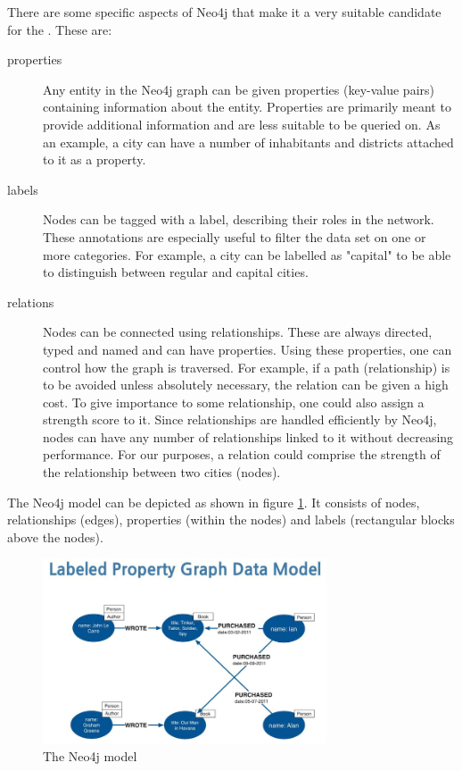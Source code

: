 There are some specific aspects of Neo4j that make it a very suitable candidate for the . These are:

\begin{description}
\item[properties] Any entity in the Neo4j graph can be given properties (key-value pairs) containing information about the entity. Properties are primarily meant to provide additional information and are less suitable to be queried on. As an example, a city can have a number of inhabitants and districts attached to it as a property.
\item[labels] Nodes can be tagged with a label, describing their roles in the network. These annotations are especially useful to filter the data set on one or more categories. For example, a city can be labelled as "capital" to be able to distinguish between regular and capital cities.
\item[relations] Nodes can be connected using relationships. These are always directed, typed and named and can have properties. Using these properties, one can control how the graph is traversed. For example, if a path (relationship) is to be avoided unless absolutely necessary, the relation can be given a high cost. To give importance to some relationship, one could also assign a strength score to it. Since relationships are handled efficiently by Neo4j, nodes can have any number of relationships linked to it without decreasing performance. For our purposes, a relation could comprise the strength of the relationship between two cities (nodes).
\end{description}

The Neo4j model can be depicted as shown in figure \ref{fig:neo4j}. It consists of nodes, relationships (edges), properties (within the nodes) and labels (rectangular blocks above the nodes).

\begin{figure}
\centering
\includegraphics[width=0.75\textwidth]{neo4j}
\caption{The Neo4j model}
\label{fig:neo4j}
\end{figure}

